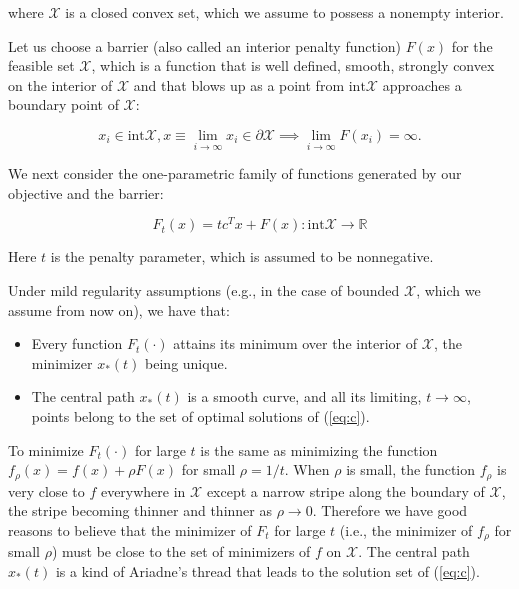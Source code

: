 \documentclass[11pt,a4paper]{article}
\newcommand{\X}{\mathcal{X}}
\newcommand{\R}{\mathbb{R}}
\begin{document}
where $\mathcal{X}$ is a closed convex set, which we assume to possess a nonempty interior.

Let us choose a barrier (also called an interior penalty function) $F(x)$ for the feasible set $\mathcal{X}$, which is a function that is well defined, smooth, strongly convex on the interior of $\mathcal{X}$ and that blows up as a point from $\text{int}\mathcal{X}$ approaches a boundary point of $\mathcal{X}$:

\begin{equation*}
    x_i \in \text{int} \mathcal{X}, x \equiv \underset{i\to \infty}{\lim} x_i \in \partial\mathcal{X} \implies \underset{i \to \infty}{\lim} F(x_i) = \infty.
\end{equation*}

We next consider the one-parametric family of functions generated by our objective and the barrier:

\begin{equation*}
    F_t(x) = tc^T x+F(x) : \text{int} \mathcal{X} \to \R
\end{equation*}

Here $t$ is the penalty parameter, which is assumed to be nonnegative.

Under mild regularity assumptions (e.g., in the case of bounded $\X$, which we assume from now on), we have that:

\begin{itemize}
    \item Every function $F_t(\cdot)$ attains its minimum over the interior of $\X$, the minimizer $x_*(t)$ being unique.
    \item The central path $x_*(t)$ is a smooth curve, and all its limiting, $t \to \infty$, points belong to the set of optimal solutions of (\ref{eq:c}).
\end{itemize}

To minimize $F_t(\cdot)$ for large $t$ is the same as minimizing the function $f_\rho (x) = f(x)+\rho F(x)$ for small $\rho =1/t$. When $\rho$ is small, the function $f_\rho$ is very close to $f$ everywhere in $\mathcal{X}$ except a narrow stripe along the boundary of $\mathcal{X}$, the stripe becoming thinner and thinner as $\rho \to 0$. Therefore we have good reasons to believe that the minimizer of $F_t$ for large $t$ (i.e., the minimizer of $f_\rho$ for small $\rho$) must be close to the set of minimizers of $f$ on $\X$. The central path $x_*(t)$ is a kind of Ariadne's thread that leads to the solution set of (\ref{eq:c}).
\end{document}
